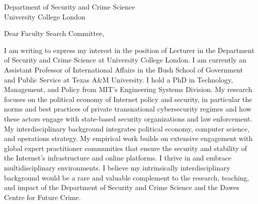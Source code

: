 \documentclass[11pt]{letter}
\begin{document}
\begin{letter}
{
  Department of Security and Crime Science \\ 
  University College London
}

\opening{Dear Faculty Search Committee,}

I am writing to express my interest in the position of Lecturer in the Department of Security and Crime Science at University College London.  
%
I am currently an Assistant Professor of International Affairs in the Bush School of Government and Public Service at Texas A\&M University.  
%
I hold a PhD in Technology, Management, and Policy from MIT's Engineering Systems Division.
%
My research focuses on the political economy of Internet policy and security, in particular the norms and best practices of private transnational cybersecurity regimes and how these actors engage with state-based security organizations and law enforcement.
%
My interdisciplinary background integrates political economy, computer science, and operations strategy. 
%
My empirical work builds on extensive engagement with global expert practitioner communities that ensure the security and stability of the Internet's infrastructure and online platforms.
%
%
%
I thrive in and embrace multidisciplinary environments.
%
I believe my intrinsically interdisciplinary background would be a rare and valuable complement to the research, teaching, and impact of the Department of Security and Crime Science and the Dawes Centre for Future Crime. 
%



\end{letter}
\end{document}

